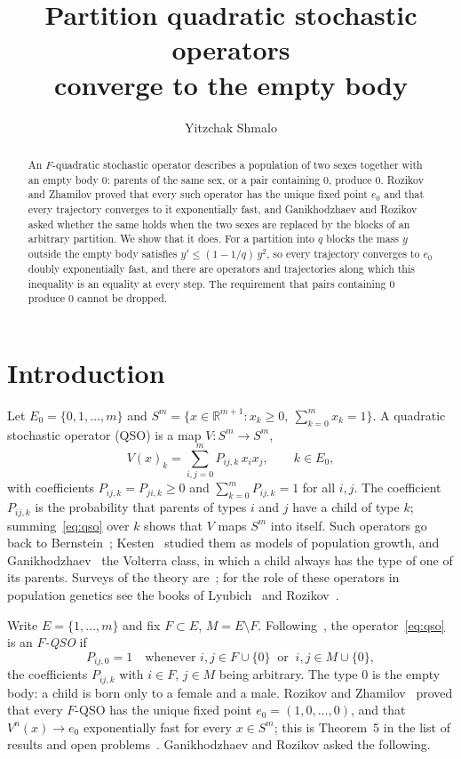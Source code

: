 \documentclass[11pt]{amsart}
\title[Partition quadratic stochastic operators]{Partition quadratic stochastic operators\\ converge to the empty body}
\author{Yitzchak Shmalo}
\theoremstyle{definition}
\theoremstyle{remark}
\numberwithin{equation}{section}
\begin{document}
\begin{abstract}
An $F$-quadratic stochastic operator describes a population of two sexes together with an empty body $0$: parents of the same sex, or a pair containing $0$, produce $0$. Rozikov and Zhamilov proved that every such operator has the unique fixed point $e_0$ and that every trajectory converges to it exponentially fast, and Ganikhodzhaev and Rozikov asked whether the same holds when the two sexes are replaced by the blocks of an arbitrary partition. We show that it does. For a partition into $q$ blocks the mass $y$ outside the empty body satisfies $y'\le(1-1/q)\,y^2$, so every trajectory converges to $e_0$ doubly exponentially fast, and there are operators and trajectories along which this inequality is an equality at every step. The requirement that pairs containing $0$ produce $0$ cannot be dropped.
\end{abstract}

\maketitle

\section{Introduction}

Let $E_0=\{0,1,\dots,m\}$ and $S^m=\{x\in\mathbb R^{m+1}: x_k\ge0,\ \sum_{k=0}^m x_k=1\}$. A quadratic stochastic operator (QSO) is a map $V\colon S^m\to S^m$,
\begin{equation}\label{eq:qso}
V(x)_k=\sum_{i,j=0}^m P_{ij,k}\,x_ix_j,\qquad k\in E_0,
\end{equation}
with coefficients $P_{ij,k}=P_{ji,k}\ge0$ and $\sum_{k=0}^m P_{ij,k}=1$ for all $i,j$. The coefficient $P_{ij,k}$ is the probability that parents of types $i$ and $j$ have a child of type $k$; summing~\eqref{eq:qso} over $k$ shows that $V$ maps $S^m$ into itself. Such operators go back to Bernstein~\cite{Ber}; Kesten~\cite{Kes} studied them as models of population growth, and Ganikhodzhaev~\cite{Gan} the Volterra class, in which a child always has the type of one of its parents. Surveys of the theory are~\cite{GR,GMR}; for the role of these operators in population genetics see the books of Lyubich~\cite{Lyu} and Rozikov~\cite{Roz}.

Write $E=\{1,\dots,m\}$ and fix $F\subset E$, $M=E\setminus F$. Following~\cite{RZ0,RZ}, the operator~\eqref{eq:qso} is an \emph{$F$-QSO} if
\begin{equation}\label{eq:FQSO}
P_{ij,0}=1\quad\text{whenever } i,j\in F\cup\{0\}\ \text{ or }\ i,j\in M\cup\{0\},
\end{equation}
the coefficients $P_{ij,k}$ with $i\in F$, $j\in M$ being arbitrary. The type $0$ is the empty body: a child is born only to a female and a male. Rozikov and Zhamilov~\cite{RZ} proved that every $F$-QSO has the unique fixed point $e_0=(1,0,\dots,0)$, and that $V^n(x)\to e_0$ exponentially fast for every $x\in S^m$; this is Theorem~5 in the list of results and open problems~\cite{GR}. Ganikhodzhaev and Rozikov asked the following.
\end{document}
